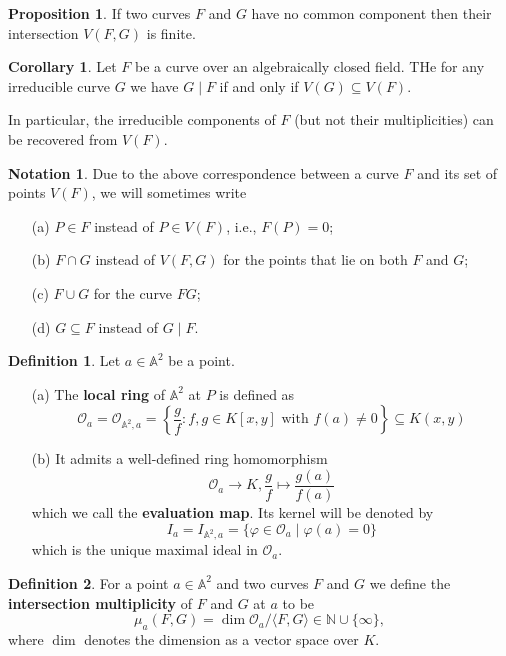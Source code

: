 \documentclass[12pt]{article}
\theoremstyle{definition}
\newtheorem{corollary}{Corollary}
\newtheorem{proposition}{Proposition}
\newtheorem{definition}{Definition}
\newtheorem{notation}{Notation}
\newcommand{\N}{\mathbb{N}}
\renewcommand{\phi}{\varphi}
\newcommand{\<}{\langle}
\renewcommand{\>}{\rangle}
\newcommand{\A}{\mathbb{A}}
\renewcommand{\O}{\mathscr{O}}
\begin{document}
\begin{proposition}
    If two curves $F$ and $G$ have no common component then their intersection $V(F, G)$ is finite.
\end{proposition}

\begin{corollary}
    Let $F$ be a curve over an algebraically closed field. THe for any irreducible curve $G$ we have $G \mid F$ if and only if $V(G) \subseteq V(F)$.

    In particular, the irreducible components of $F$ (but not their multiplicities) can be recovered from $V(F)$.
\end{corollary}


\begin{notation}
    Due to the above correspondence between a curve $F$ and its set of points $V(F)$, we will sometimes write
    \begin{itemize}
        \item[(a)] $P \in F$ instead of $P \in V(F)$, i.e., $F(P) = 0$;
        \item[(b)] $F \cap G$ instead of $V(F, G)$ for the points that lie on both $F$ and $G$;
        \item[(c)] $F \cup G$ for the curve $FG$;
        \item[(d)] $G \subseteq F$ instead of $G \mid F$.
    \end{itemize}
\end{notation}


\begin{definition}
    Let $a \in \A^2$ be a point.
    \begin{itemize}
        \item[(a)] The \textbf{local ring} of $\A^2$ at $P$ is defined as
        \[
            \O_a 
                = \O_{\A^2, a} 
                = \left\{\frac{g}{f} : f, g \in K[x, y] \text{ with } f(a) \ne 0 \right\}
                \subseteq K(x, y)
        \]
        \item[(b)] It admits a well-defined ring homomorphism
        \[
            \O_a \to K, \frac{g}{f} \mapsto \frac{g(a)}{f(a)}
        \] 
        which we call the \textbf{evaluation map}. Its kernel will be denoted by
        \[
            I_a = I_{\A^2, a} = \{\phi \in \O_a \mid \phi(a) = 0\}
        \]
        which is the unique maximal ideal in $\O_a$.
    \end{itemize}
\end{definition}


\begin{definition}
    For a point $a \in \A^2$ and two curves $F$ and $G$ we define the \textbf{intersection multiplicity} of $F$ and $G$ at $a$ to be
    \[
        \mu_a(F, G) = \dim \O_a / \<F, G\> \in \N \cup \{\infty\},
    \]
    where $\dim$ denotes the dimension as a vector space over $K$.
\end{definition}
\end{document}
